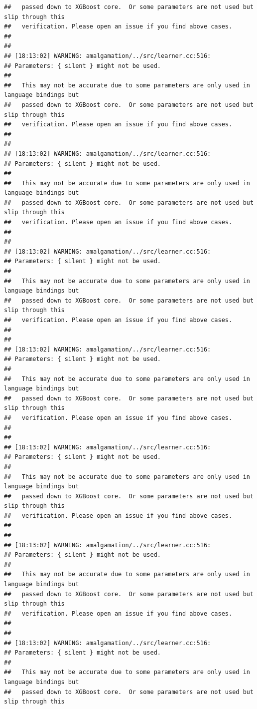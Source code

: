 \documentclass[AMS,STIX2COL]{WileyNJD-v2}\usepackage[]{graphicx}\usepackage[]{color}
\makeatletter
\newenvironment{kframe}{%
 \def\at@end@of@kframe{}%
 \ifinner\ifhmode%
  \def\at@end@of@kframe{\end{minipage}}%
  \begin{minipage}{\columnwidth}%
 \fi\fi%
 \def\FrameCommand##1{\hskip\@totalleftmargin \hskip-\fboxsep
 \colorbox{shadecolor}{##1}\hskip-\fboxsep
     \hskip-\linewidth \hskip-\@totalleftmargin \hskip\columnwidth}%
 \MakeFramed {\advance\hsize-\width
   \@totalleftmargin\z@ \linewidth\hsize
   \@setminipage}}%
 {\par\unskip\endMakeFramed%
 \at@end@of@kframe}
\newenvironment{knitrout}{}{} %
\makeatother
\begin{document}
\begin{knitrout}
\begin{kframe}
\begin{verbatim}
##   passed down to XGBoost core.  Or some parameters are not used but slip through this
##   verification. Please open an issue if you find above cases.
## 
## 
## [18:13:02] WARNING: amalgamation/../src/learner.cc:516: 
## Parameters: { silent } might not be used.
## 
##   This may not be accurate due to some parameters are only used in language bindings but
##   passed down to XGBoost core.  Or some parameters are not used but slip through this
##   verification. Please open an issue if you find above cases.
## 
## 
## [18:13:02] WARNING: amalgamation/../src/learner.cc:516: 
## Parameters: { silent } might not be used.
## 
##   This may not be accurate due to some parameters are only used in language bindings but
##   passed down to XGBoost core.  Or some parameters are not used but slip through this
##   verification. Please open an issue if you find above cases.
## 
## 
## [18:13:02] WARNING: amalgamation/../src/learner.cc:516: 
## Parameters: { silent } might not be used.
## 
##   This may not be accurate due to some parameters are only used in language bindings but
##   passed down to XGBoost core.  Or some parameters are not used but slip through this
##   verification. Please open an issue if you find above cases.
## 
## 
## [18:13:02] WARNING: amalgamation/../src/learner.cc:516: 
## Parameters: { silent } might not be used.
## 
##   This may not be accurate due to some parameters are only used in language bindings but
##   passed down to XGBoost core.  Or some parameters are not used but slip through this
##   verification. Please open an issue if you find above cases.
## 
## 
## [18:13:02] WARNING: amalgamation/../src/learner.cc:516: 
## Parameters: { silent } might not be used.
## 
##   This may not be accurate due to some parameters are only used in language bindings but
##   passed down to XGBoost core.  Or some parameters are not used but slip through this
##   verification. Please open an issue if you find above cases.
## 
## 
## [18:13:02] WARNING: amalgamation/../src/learner.cc:516: 
## Parameters: { silent } might not be used.
## 
##   This may not be accurate due to some parameters are only used in language bindings but
##   passed down to XGBoost core.  Or some parameters are not used but slip through this
##   verification. Please open an issue if you find above cases.
## 
## 
## [18:13:02] WARNING: amalgamation/../src/learner.cc:516: 
## Parameters: { silent } might not be used.
## 
##   This may not be accurate due to some parameters are only used in language bindings but
##   passed down to XGBoost core.  Or some parameters are not used but slip through this

\end{verbatim}
\end{kframe}
\end{knitrout}
\end{document}
